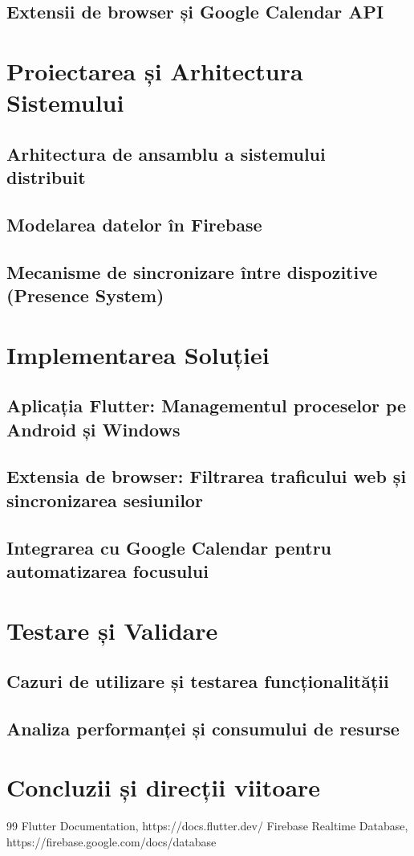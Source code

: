 \documentclass[12pt,a4paper,oneside]{report}
\begin{document}
\section{Extensii de browser și Google Calendar API}

\chapter{Proiectarea și Arhitectura Sistemului}
\section{Arhitectura de ansamblu a sistemului distribuit}
\section{Modelarea datelor în Firebase}
\section{Mecanisme de sincronizare între dispozitive (Presence System)}

\chapter{Implementarea Soluției}
\section{Aplicația Flutter: Managementul proceselor pe Android și Windows}
\section{Extensia de browser: Filtrarea traficului web și sincronizarea sesiunilor}
\section{Integrarea cu Google Calendar pentru automatizarea focusului}

\chapter{Testare și Validare}
\section{Cazuri de utilizare și testarea funcționalității}
\section{Analiza performanței și consumului de resurse}

\chapter{Concluzii și direcții viitoare}


\begin{thebibliography}{99}
 Flutter Documentation, https://docs.flutter.dev/
 Firebase Realtime Database, https://firebase.google.com/docs/database
\end{thebibliography}
\end{document}
